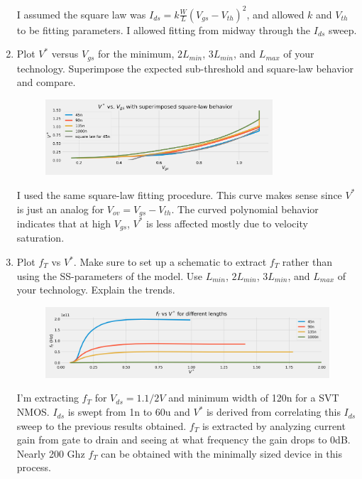\begin{enumerate}
    I assumed the square law was $I_{ds} = k \frac{W}{L} (V_{gs} - V_{th})^2$, and allowed $k$ and $V_{th}$ to be fitting parameters. I allowed fitting from midway through the $I_{ds}$ sweep.

\item {\color{blue}Plot $V^*$ versus $V_{gs}$ for the minimum, $2 L_{min}$, $3 L_{min}$, and $L_{max}$ of your technology. Superimpose the expected sub-threshold and square-law behavior and compare.}

    \begin{figure}[H]
        \centering
        \includegraphics[width=0.8\textwidth]{figs/problem9.png}
    \end{figure}

    I used the same square-law fitting procedure. This curve makes sense since $V^*$ is just an analog for $V_{ov} = V_{gs} - V_{th}$. The curved polynomial behavior indicates that at high $V_{gs}$, $V^*$ is less affected mostly due to velocity saturation.

\item {\color{blue}Plot $f_T$ vs $V^*$. Make sure to set up a schematic to extract $f_T$ rather than using the SS-parameters of the model. Use $L_{min}$, $2 L_{min}$, $3 L_{min}$, and $L_{max}$ of your technology. Explain the trends.}

    \begin{figure}[H]
        \centering
        \includegraphics[width=\textwidth]{figs/problem10.png}
    \end{figure}

    I'm extracting $f_T$ for $V_{ds} = 1.1/2 V$ and minimum width of 120n for a SVT NMOS. $I_{ds}$ is swept from 1n to 60u and $V^*$ is derived from correlating this $I_{ds}$ sweep to the previous results obtained. $f_T$ is extracted by analyzing current gain from gate to drain and seeing at what frequency the gain drops to 0dB. Nearly 200 Ghz $f_T$ can be obtained with the minimally sized device in this process.


\end{enumerate}
